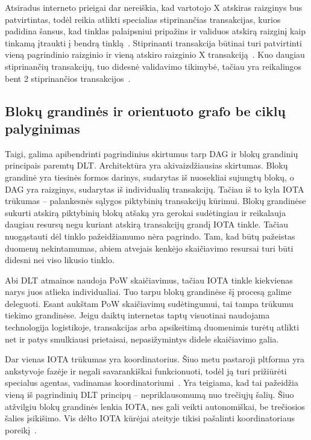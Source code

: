 Atsiradus interneto prieigai dar nereiškia, kad vartotojo X atskiras raizginys bus patvirtintas, todėl reikia atlikti specialias stiprinančias transakcijas, kurios padidina šansus, kad tinklas palaipsniui pripažins ir validuos atskirą raizginį kaip tinkamą įtraukti į bendrą tinklą~\cite{bennet2017technical}. Stiprinanti transakcija būtinai turi patvirtinti vieną pagrindinio raizginio ir vieną atskiro raizginio X transakciją~\cite{bennet2017technical}. Kuo daugiau stiprinančių transakcijų, tuo didesnė validavimo tikimybė, tačiau yra reikalingos bent 2 stiprinančios transakcijos~\cite{bennet2017technical}.




\subsection{Blokų grandinės ir orientuoto grafo be ciklų palyginimas} \label{subsection:dlt-compare}

Taigi, galima apibendrinti pagrindinius skirtumus tarp DAG ir blokų grandinių principais paremtų DLT. Architektūra yra akivaizdžiausias skirtumas. Blokų grandinė yra tiesinės formos darinys, sudarytas iš nuosekliai sujungtų blokų, o DAG yra raizginys, sudarytas iš individualių transakcijų. Tačiau iš to kyla IOTA trūkumas – palankesnės sąlygos piktybinių transakcijų kūrimui. Blokų grandinėse sukurti atskirą piktybinių blokų atšaką yra gerokai sudėtingiau ir reikalauja daugiau resursų negu kuriant atskirą transakcijų grandį IOTA tinkle. Tačiau nuogąstauti dėl tinklo pažeidžiamumo nėra pagrindo. Tam, kad būtų pažeistas duomenų nekintamumas, abiem atvejais kenkėjo skaičiavimo resursai turi būti didesni nei viso likusio tinklo.

Abi DLT atmainos naudoja PoW skaičiavimus, tačiau IOTA tinkle kiekvienas narys juos atlieka individualiai. Tuo tarpu blokų grandinėse šį procesą galime deleguoti. Esant aukštam PoW skaičiavimų sudėtingumui, tai tampa trūkumu tiekimo grandinėse. Jeigu daiktų internetas taptų visuotinai naudojama technologija logistikoje, transakcijas arba apsikeitimą duomenimis turėtų atlikti net ir patys smulkiausi prietaisai, nepasižymintys didele skaičiavimo galia.

Dar vienas IOTA trūkumas yra koordinatorius. Šiuo metu pastaroji pltforma yra ankstyvoje fazėje ir negali savarankiškai funkcionuoti, todėl ją turi prižiūrėti specialus agentas, vadinamas koordinatoriumi~\cite{bramas2018stability}. Yra teigiama, kad tai pažeidžia vieną iš pagrindinių DLT principų – nepriklausomumą nuo trečiųjų šalių. Šiuo atžvilgiu blokų grandinės lenkia IOTA, nes gali veikti autonomiškai, be trečiosios šalies įsikišimo. Vis dėlto IOTA kūrėjai ateityje tikisi pašalinti koordinatoriaus poreikį~\cite{bramas2018stability}.


